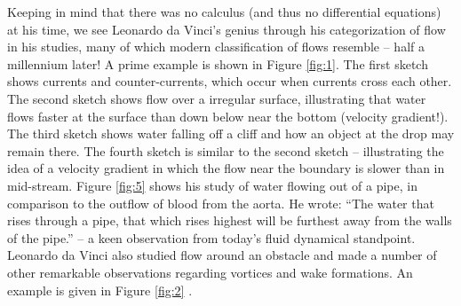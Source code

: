 \documentclass[12pt]{article}
\begin{document}
Keeping in mind that there was no calculus (and thus no differential equations) at his time, we see Leonardo da Vinci's genius through his categorization of flow in his studies, many of which modern classification of flows resemble -- half a millennium later! A prime example is shown in Figure \ref{fig:1}. The first sketch shows currents and counter-currents, which occur when currents cross each other. The second sketch shows flow over a irregular surface, illustrating that water flows faster at the surface than down below near the bottom (velocity gradient!). The third sketch shows water falling off a cliff and how an object at the drop may remain there. The fourth sketch is similar to the second sketch -- illustrating the idea of a velocity gradient in which the flow near the boundary is slower than in mid-stream.  Figure \ref{fig:5} shows his study of water flowing out of a pipe, in comparison to the outflow of blood from the aorta. He wrote: ``The water that rises through a pipe, that which rises highest will be furthest away from the walls of the pipe.'' -- a keen observation from today's fluid dynamical standpoint.  Leonardo da Vinci also studied flow around an obstacle and made a number of other remarkable observations regarding vortices and wake formations. An example is given in Figure \ref{fig:2} \cite{marusic2021leonardo}. \\
\end{document}
